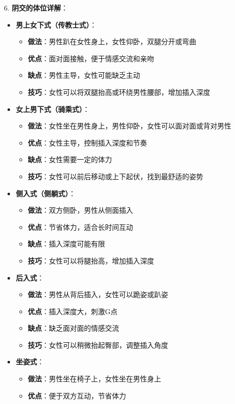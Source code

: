 \documentclass[12pt,UTF8]{ctexbook}
\begin{document}
6. \textbf{阴交的体位详解}：
\begin{itemize}
	\item \textbf{男上女下式（传教士式）}：
	\begin{itemize}
		\item \textbf{做法}：男性趴在女性身上，女性仰卧，双腿分开或弯曲
		\item \textbf{优点}：面对面接触，便于情感交流和亲吻
		\item \textbf{缺点}：男性主导，女性可能缺乏主动
		\item \textbf{技巧}：女性可以将双腿抬高或环绕男性腰部，增加插入深度
	\end{itemize}
	\item \textbf{女上男下式（骑乘式）}：
	\begin{itemize}
		\item \textbf{做法}：女性坐在男性身上，男性仰卧，女性可以面对面或背对男性
		\item \textbf{优点}：女性主导，控制插入深度和节奏
		\item \textbf{缺点}：女性需要一定的体力
		\item \textbf{技巧}：女性可以前后移动或上下起伏，找到最舒适的姿势
	\end{itemize}
	\item \textbf{侧入式（侧躺式）}：
	\begin{itemize}
		\item \textbf{做法}：双方侧卧，男性从侧面插入
		\item \textbf{优点}：节省体力，适合长时间互动
		\item \textbf{缺点}：插入深度可能有限
		\item \textbf{技巧}：女性可以将腿抬高，增加插入深度
	\end{itemize}
	\item \textbf{后入式}：
	\begin{itemize}
		\item \textbf{做法}：男性从背后插入，女性可以跪姿或趴姿
		\item \textbf{优点}：插入深度大，刺激G点
		\item \textbf{缺点}：缺乏面对面的情感交流
		\item \textbf{技巧}：女性可以稍微抬起臀部，调整插入角度
	\end{itemize}
	\item \textbf{坐姿式}：
	\begin{itemize}
		\item \textbf{做法}：男性坐在椅子上，女性坐在男性身上
		\item \textbf{优点}：便于双方互动，节省体力

\end{itemize}
\end{itemize}
\end{document}
